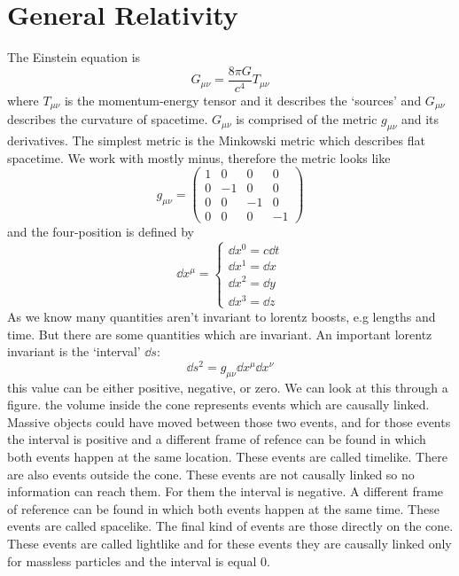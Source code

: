 \section{General Relativity}
The Einstein equation is
\begin{equation}
    G_{\mu\nu} = \frac{8\pi G}{c^4}T_{\mu\nu}
\end{equation}
where \(T_{\mu\nu}\) is the momentum-energy tensor and it describes the `sources' and \(G_{\mu\nu}\) describes the curvature of spacetime. \(G_{\mu\nu}\) is comprised of the metric \(g_{\mu\nu}\) and its derivatives. The simplest metric is the Minkowski metric which describes flat spacetime. We work with mostly minus, therefore the metric looks like
\begin{equation}
    g_{\mu\nu} = \begin{pmatrix}
        1&0&0&0\\0&-1&0&0\\0&0&-1&0\\0&0&0&-1
    \end{pmatrix}
\end{equation}
and the four-position is defined by
\begin{equation}
    \dd x^\mu = \begin{cases}
        \dd x^0 = c\dd t\\
        \dd x^1 = \dd x\\
        \dd x^2 = \dd y\\
        \dd x^3 = \dd z
    \end{cases}
\end{equation}
As we know many quantities aren't invariant to lorentz boosts, e.g lengths and time. But there are some quantities which are invariant. An important lorentz invariant is the `interval' \(\dd s\):
\begin{equation}
    \dd s^2 = g_{\mu\nu} \dd x^\mu \dd x^\nu
\end{equation}
this value can be either positive, negative, or zero. We can look at this through a figure.
the volume inside the cone represents events which are causally linked. Massive objects could have moved between those two events, and for those events the interval is positive and a different frame of refence can be found in which both events happen at the same location. These events are called timelike. There are also events outside the cone. These events are not causally linked so no information can reach them. For them the interval is negative. A different frame of reference can be found in which both events happen at the same time. These events are called spacelike. The final kind of events are those directly on the cone. These events are called lightlike and for these events they are causally linked only for massless particles and the interval is equal 0.

